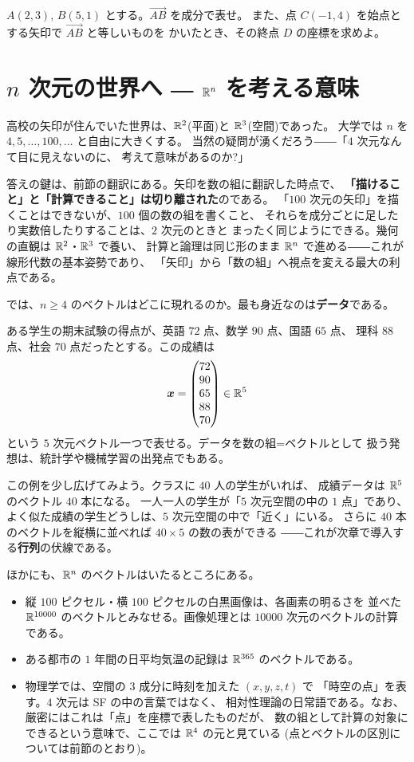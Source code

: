 \begin{mondai}\label{q:freevec}
$A(2, 3)$, $B(5, 1)$ とする。$\overrightarrow{AB}$ を成分で表せ。
また、点 $C(-1, 4)$ を始点とする矢印で $\overrightarrow{AB}$ と等しいものを
かいたとき、その終点 $D$ の座標を求めよ。
\end{mondai}

\section{$n$ 次元の世界へ ― $\mathbb{R}^n$ を考える意味}

高校の矢印が住んでいた世界は、$\mathbb{R}^2$(平面)と $\mathbb{R}^3$(空間)であった。
大学では $n$ を $4, 5, \dots, 100, \dots$ と自由に大きくする。
当然の疑問が湧くだろう――「$4$ 次元なんて目に見えないのに、
考えて意味があるのか?」

答えの鍵は、前節の翻訳にある。矢印を数の組に翻訳した時点で、
\textbf{「描けること」と「計算できること」は切り離された}のである。
「$100$ 次元の矢印」を描くことはできないが、$100$ 個の数の組を書くこと、
それらを成分ごとに足したり実数倍したりすることは、$2$ 次元のときと
まったく同じようにできる。幾何の直観は $\mathbb{R}^2$・$\mathbb{R}^3$ で養い、
計算と論理は同じ形のまま $\mathbb{R}^n$ で進める――これが線形代数の基本姿勢であり、
「矢印」から「数の組」へ視点を変える最大の利点である。

では、$n \ge 4$ のベクトルはどこに現れるのか。最も身近なのは\textbf{データ}である。

\begin{rei}
ある学生の期末試験の得点が、英語 $72$ 点、数学 $90$ 点、国語 $65$ 点、
理科 $88$ 点、社会 $70$ 点だったとする。この成績は
\[
\bm{x} = \begin{pmatrix}72 \\ 90 \\ 65 \\ 88 \\ 70\end{pmatrix} \in \mathbb{R}^5
\]
という $5$ 次元ベクトル一つで表せる。データを数の組=ベクトルとして
扱う発想は、統計学や機械学習の出発点でもある。
\end{rei}

この例を少し広げてみよう。クラスに $40$ 人の学生がいれば、
成績データは $\mathbb{R}^5$ のベクトル $40$ 本になる。
一人一人の学生が「$5$ 次元空間の中の $1$ 点」であり、
よく似た成績の学生どうしは、$5$ 次元空間の中で「近く」にいる。
さらに $40$ 本のベクトルを縦横に並べれば $40 \times 5$ の数の表ができる
――これが次章で導入する\textbf{行列}の伏線である。

ほかにも、$\mathbb{R}^n$ のベクトルはいたるところにある。
\begin{itemize}
\item 縦 $100$ ピクセル・横 $100$ ピクセルの白黒画像は、各画素の明るさを
並べた $\mathbb{R}^{10000}$ のベクトルとみなせる。画像処理とは
$10000$ 次元のベクトルの計算である。
\item ある都市の $1$ 年間の日平均気温の記録は $\mathbb{R}^{365}$ のベクトルである。
\item 物理学では、空間の $3$ 成分に時刻を加えた $(x, y, z, t)$ で
「時空の点」を表す。$4$ 次元は SF の中の言葉ではなく、
相対性理論の日常語である。なお、厳密にはこれは「点」を座標で表したものだが、
数の組として計算の対象にできるという意味で、ここでは $\mathbb{R}^4$ の元と見ている
(点とベクトルの区別については前節のとおり)。
\end{itemize}

